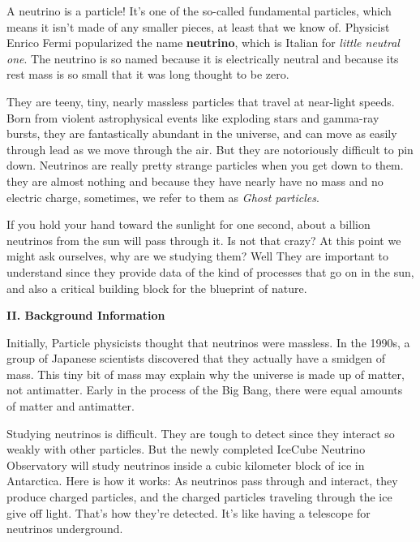 \documentclass[fleqn]{article}
\begin{document}
  A neutrino is a particle! It’s one of the so-called fundamental particles, which means it isn’t made of any 
  smaller pieces, at least that we know of. Physicist Enrico Fermi popularized the name \textbf{neutrino}, 
  which is Italian for \emph{little neutral one}. The neutrino is so named because it is electrically neutral 
  and because its rest mass is so small that it was long thought to be zero.

  They are teeny, tiny, nearly massless particles that travel at near-light speeds. Born from violent astrophysical events 
  like exploding stars and gamma-ray bursts, they are fantastically abundant in the universe, and can move as easily through 
  lead as we move through the air. But they are notoriously difficult to pin down. Neutrinos are really pretty strange particles 
  when you get down to them. they are almost nothing and because they have nearly have no mass and no electric charge, sometimes, 
  we refer to them as \emph{Ghost particles}.

  If you hold your hand toward the sunlight for one second, about a billion neutrinos from the sun will pass through it. Is not that crazy? 
  At this point we might ask ourselves, why are we studying them? Well They are important to understand since they provide data of the kind 
  of processes that go on in the sun, and also a critical building block for the blueprint of nature.

  \vspace{20px}

  \textbf{II. Background Information}

  \vspace{10px}

  Initially, Particle physicists thought that neutrinos were massless. In the 1990s, a group of Japanese scientists discovered that they 
  actually have a smidgen of mass. This tiny bit of mass may explain why the universe is made up of matter, not antimatter. Early in the 
  process of the Big Bang, there were equal amounts of matter and antimatter.

  Studying neutrinos is difficult. They are tough to detect since they interact so weakly with other particles. But the newly completed 
  IceCube Neutrino Observatory will study neutrinos inside a cubic kilometer block of ice in Antarctica. Here is how it works: 
  As neutrinos pass through and interact, they produce charged particles, and the charged particles traveling through the ice give off light.
  That’s how they’re detected. It’s like having a telescope for neutrinos underground.
\end{document}
